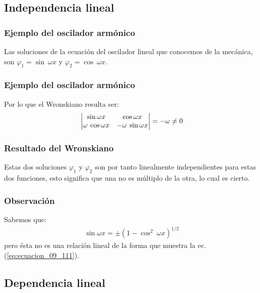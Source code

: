 \documentclass[12pt]{beamer}
\begin{document}
\subsection{Independencia lineal}

\begin{frame}
\frametitle{Ejemplo del oscilador armónico}
Las soluciones de la ecuación del oscilador lineal que conocemos de la mecánica, son $\varphi_{1} = \sin \: \omega x$ y $\varphi_{2} = \cos \: \omega x$.
\end{frame}
\begin{frame}
\frametitle{Ejemplo del oscilador armónico}
Por lo que el Wronskiano resulta ser:
\pause
\begin{align*}
\mdet{
\sin \omega x & \cos \omega x \\
\omega \: \cos \omega x & - \omega \: \sin \omega x
} = -\omega \neq 0
\end{align*}
\end{frame}
\begin{frame}
\frametitle{Resultado del Wronskiano}
Estas dos soluciones $\varphi_{1}$ y $\varphi_{2}$ son por tanto linealmente independientes para estas dos funciones, esto significa que una no es múltiplo de la otra, lo cual es cierto.
\end{frame}
\begin{frame}
\frametitle{Observación}
Sabemos que:
\pause
\begin{align*}
\sin \omega x = \pm (1 - \cos^{2} \: \omega x)^{1/2}
\end{align*}
pero ésta no es una relación lineal de la forma que muestra la ec. (\ref{eq:ecuacion_09_111}).
\end{frame}

\subsection{Dependencia lineal}
\end{document}
